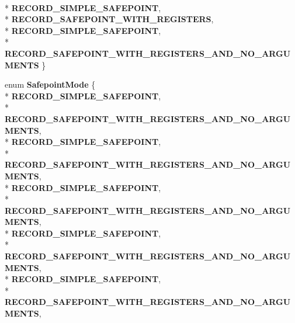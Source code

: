 \begin{DoxyCompactItemize}
\\*
{\bfseries R\+E\+C\+O\+R\+D\+\_\+\+S\+I\+M\+P\+L\+E\+\_\+\+S\+A\+F\+E\+P\+O\+I\+NT}, 
\\*
{\bfseries R\+E\+C\+O\+R\+D\+\_\+\+S\+A\+F\+E\+P\+O\+I\+N\+T\+\_\+\+W\+I\+T\+H\+\_\+\+R\+E\+G\+I\+S\+T\+E\+RS}, 
\\*
{\bfseries R\+E\+C\+O\+R\+D\+\_\+\+S\+I\+M\+P\+L\+E\+\_\+\+S\+A\+F\+E\+P\+O\+I\+NT}, 
\\*
{\bfseries R\+E\+C\+O\+R\+D\+\_\+\+S\+A\+F\+E\+P\+O\+I\+N\+T\+\_\+\+W\+I\+T\+H\+\_\+\+R\+E\+G\+I\+S\+T\+E\+R\+S\+\_\+\+A\+N\+D\+\_\+\+N\+O\+\_\+\+A\+R\+G\+U\+M\+E\+N\+TS}
 \}\hypertarget{classv8_1_1internal_1_1_l_code_gen_a166a08e2444941f7aec4c9748db666d0}{}\label{classv8_1_1internal_1_1_l_code_gen_a166a08e2444941f7aec4c9748db666d0}

\item 
enum {\bfseries Safepoint\+Mode} \{ \\*
{\bfseries R\+E\+C\+O\+R\+D\+\_\+\+S\+I\+M\+P\+L\+E\+\_\+\+S\+A\+F\+E\+P\+O\+I\+NT}, 
\\*
{\bfseries R\+E\+C\+O\+R\+D\+\_\+\+S\+A\+F\+E\+P\+O\+I\+N\+T\+\_\+\+W\+I\+T\+H\+\_\+\+R\+E\+G\+I\+S\+T\+E\+R\+S\+\_\+\+A\+N\+D\+\_\+\+N\+O\+\_\+\+A\+R\+G\+U\+M\+E\+N\+TS}, 
\\*
{\bfseries R\+E\+C\+O\+R\+D\+\_\+\+S\+I\+M\+P\+L\+E\+\_\+\+S\+A\+F\+E\+P\+O\+I\+NT}, 
\\*
{\bfseries R\+E\+C\+O\+R\+D\+\_\+\+S\+A\+F\+E\+P\+O\+I\+N\+T\+\_\+\+W\+I\+T\+H\+\_\+\+R\+E\+G\+I\+S\+T\+E\+R\+S\+\_\+\+A\+N\+D\+\_\+\+N\+O\+\_\+\+A\+R\+G\+U\+M\+E\+N\+TS}, 
\\*
{\bfseries R\+E\+C\+O\+R\+D\+\_\+\+S\+I\+M\+P\+L\+E\+\_\+\+S\+A\+F\+E\+P\+O\+I\+NT}, 
\\*
{\bfseries R\+E\+C\+O\+R\+D\+\_\+\+S\+A\+F\+E\+P\+O\+I\+N\+T\+\_\+\+W\+I\+T\+H\+\_\+\+R\+E\+G\+I\+S\+T\+E\+R\+S\+\_\+\+A\+N\+D\+\_\+\+N\+O\+\_\+\+A\+R\+G\+U\+M\+E\+N\+TS}, 
\\*
{\bfseries R\+E\+C\+O\+R\+D\+\_\+\+S\+I\+M\+P\+L\+E\+\_\+\+S\+A\+F\+E\+P\+O\+I\+NT}, 
\\*
{\bfseries R\+E\+C\+O\+R\+D\+\_\+\+S\+A\+F\+E\+P\+O\+I\+N\+T\+\_\+\+W\+I\+T\+H\+\_\+\+R\+E\+G\+I\+S\+T\+E\+R\+S\+\_\+\+A\+N\+D\+\_\+\+N\+O\+\_\+\+A\+R\+G\+U\+M\+E\+N\+TS}, 
\\*
{\bfseries R\+E\+C\+O\+R\+D\+\_\+\+S\+I\+M\+P\+L\+E\+\_\+\+S\+A\+F\+E\+P\+O\+I\+NT}, 
\\*
{\bfseries R\+E\+C\+O\+R\+D\+\_\+\+S\+A\+F\+E\+P\+O\+I\+N\+T\+\_\+\+W\+I\+T\+H\+\_\+\+R\+E\+G\+I\+S\+T\+E\+R\+S\+\_\+\+A\+N\+D\+\_\+\+N\+O\+\_\+\+A\+R\+G\+U\+M\+E\+N\+TS}, 

\end{DoxyCompactItemize}
